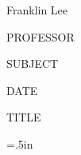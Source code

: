 \documentclass[12pt]{article}
\newcommand\lm{.5in}
\begin{document}
Franklin Lee

PROFESSOR                       %

SUBJECT                         %

DATE                            %

{\centering TITLE\par}          %

\parindent=\lm

\end{document}
